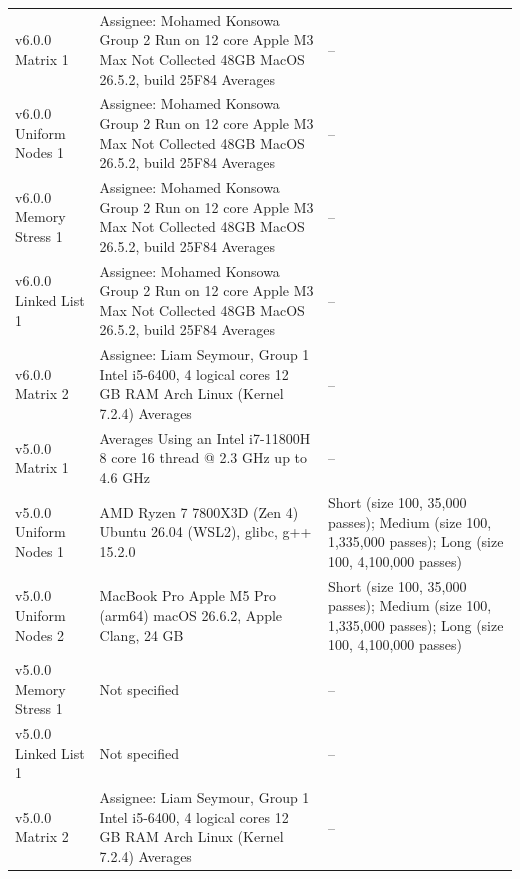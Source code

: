 \begin{longtable}{>{\raggedright\arraybackslash}p{}>{\raggedright\arraybackslash}p{}>{\raggedright\arraybackslash}p{}}
v6.0.0 \textbar{} Matrix \textbar{} 1 & Assignee: \textbar{}  Mohamed Konsowa \textbar{}  Group 2 \textbar{}  Run on 12 core Apple M3 Max \textbar{}  Not Collected \textbar{}  48GB \textbar{}  MacOS 26.5.2, build 25F84 \textbar{}  Averages & -- \\
v6.0.0 \textbar{} Uniform Nodes \textbar{} 1 & Assignee: \textbar{}  Mohamed Konsowa \textbar{}  Group 2 \textbar{}  Run on 12 core Apple M3 Max \textbar{}  Not Collected \textbar{}  48GB \textbar{}  MacOS 26.5.2, build 25F84 \textbar{}  Averages & -- \\
v6.0.0 \textbar{} Memory Stress \textbar{} 1 & Assignee: \textbar{}  Mohamed Konsowa \textbar{}  Group 2 \textbar{}  Run on 12 core Apple M3 Max \textbar{}  Not Collected \textbar{}  48GB \textbar{}  MacOS 26.5.2, build 25F84 \textbar{}  Averages & -- \\
v6.0.0 \textbar{} Linked List \textbar{} 1 & Assignee: \textbar{}  Mohamed Konsowa \textbar{}  Group 2 \textbar{}  Run on 12 core Apple M3 Max \textbar{}  Not Collected \textbar{}  48GB \textbar{}  MacOS 26.5.2, build 25F84 \textbar{}  Averages & -- \\
v6.0.0 \textbar{} Matrix \textbar{} 2 & Assignee: \textbar{}  Liam Seymour, Group 1 \textbar{}  Intel i5-6400, 4 logical cores \textbar{}  12 GB RAM \textbar{}  Arch Linux (Kernel 7.2.4) \textbar{}  Averages & -- \\
v5.0.0 \textbar{} Matrix \textbar{} 1 & Averages \textbar{}  Using an Intel i7-11800H 8 core 16 thread @ 2.3 GHz up to 4.6 GHz & -- \\
v5.0.0 \textbar{} Uniform Nodes \textbar{} 1 & AMD Ryzen 7 7800X3D (Zen 4) \textbar{}  Ubuntu 26.04 (WSL2), glibc, g++ 15.2.0 & Short (size 100, 35,000 passes); Medium (size 100, 1,335,000 passes); Long (size 100, 4,100,000 passes) \\
v5.0.0 \textbar{} Uniform Nodes \textbar{} 2 & MacBook Pro Apple M5 Pro (arm64) \textbar{}  macOS 26.6.2, Apple Clang, 24 GB & Short (size 100, 35,000 passes); Medium (size 100, 1,335,000 passes); Long (size 100, 4,100,000 passes) \\
v5.0.0 \textbar{} Memory Stress \textbar{} 1 & Not specified & -- \\
v5.0.0 \textbar{} Linked List \textbar{} 1 & Not specified & -- \\
v5.0.0 \textbar{} Matrix \textbar{} 2 & Assignee: \textbar{}  Liam Seymour, Group 1 \textbar{}  Intel i5-6400, 4 logical cores \textbar{}  12 GB RAM \textbar{}  Arch Linux (Kernel 7.2.4) \textbar{}  Averages & -- \\

\end{longtable}
